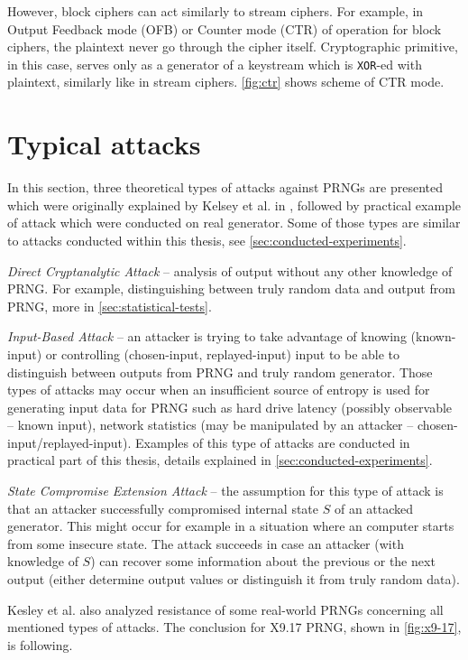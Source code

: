 \documentclass[
    digital,    %
    oneside,    %
    color,
    11pt,
    nocover,
    notable,
    nolof,
    nolot,
    final
]{fithesis3}
\renewcommand\_{\textunderscore\allowbreak}
\begin{document}
However, block ciphers can act similarly to stream ciphers. For example, in Output Feedback mode (OFB) or Counter mode (CTR) of operation for block ciphers, the plaintext never go through the cipher itself. Cryptographic primitive, in this case, serves only as a generator of a keystream which is \texttt{XOR}-ed with plaintext, similarly like in stream ciphers. \cref{fig:ctr} shows scheme of CTR mode.\cite{Dworkin:2001:SER:2206247}

\section{Typical attacks}

In this section, three theoretical types of attacks against PRNGs are presented which were originally explained by Kelsey et al. in \cite{kelsey1998cryptanalytic}, followed by practical example of attack which were conducted on real generator. Some of those types are similar to attacks conducted within this thesis, see \cref{sec:conducted-experiments}.

\textit{Direct Cryptanalytic Attack} -- analysis of output without any other knowledge of PRNG. For example, distinguishing between truly random data and output from PRNG, more in \cref{sec:statistical-tests}.

\textit{Input-Based Attack} -- an attacker is trying to take advantage of knowing (known-input) or controlling (chosen-input, replayed-input) input to be able to distinguish between outputs from PRNG and truly random generator. Those types of attacks may occur when an insufficient source of entropy is used for generating input data for PRNG such as hard drive latency (possibly observable -- known input), network statistics (may be manipulated by an attacker -- chosen-input/replayed-input). Examples of this type of attacks are conducted in practical part of this thesis, details explained in \cref{sec:conducted-experiments}.

\textit{State Compromise Extension Attack} -- the assumption for this type of attack is that an attacker successfully compromised internal state $S$ of an attacked generator. This might occur for example in a situation where an computer starts from some insecure state. The attack succeeds in case an attacker (with knowledge of $S$) can recover some information about the previous or the next output (either determine output values or distinguish it from truly random data). 

Kesley et al. \cite{kelsey1998cryptanalytic} also analyzed resistance of some real-world PRNGs concerning all mentioned types of attacks. The conclusion for X9.17 PRNG, shown in \cref{fig:x9-17}, is following.
\end{document}
